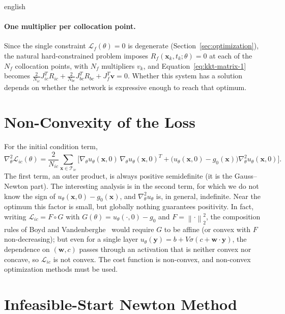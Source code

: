 \documentclass[11pt,letterpaper,twoside,openright]{book} %
\newcommand{\norm}[1]{\left\lVert #1 \right\rVert}
\newcommand{\Loss}{\mathcal{L}}
\newcommand{\T}{\mathcal{T}}
\begin{document}
\begin{hyphenrules}{english}
\paragraph{One multiplier per collocation point.}
Since the single constraint $\Loss_f(\theta)=0$ is degenerate (Section~\ref{sec:optimization}), the natural
hard-constrained problem imposes $R_f(\mathbf{x}_k,t_k;\theta)=0$ at each of the $N_f$ collocation points,
with $N_f$ multipliers $v_k$, and Equation~\eqref{eq:kkt-matrix-1} becomes
$\frac{2}{N_{ic}}J_{ic}^{T}R_{ic}+\frac{2}{N_{bc}}J_{bc}^{T}R_{bc}+J_f^{T}\mathbf{v}=0$. Whether this
system has a solution depends on whether the network is expressive enough to reach that optimum.

\section{Non-Convexity of the Loss}\label{app-sec:nonconvexity}

For the initial condition term,
\begin{equation}
  \nabla^2_\theta\Loss_{ic}(\theta)=\frac{2}{N_{ic}}\sum_{\mathbf{x}\in\T_{ic}}
  \Big[\nabla_\theta u_\theta(\mathbf{x},0)\,\nabla_\theta u_\theta(\mathbf{x},0)^{T}
  +\big(u_\theta(\mathbf{x},0)-g_0(\mathbf{x})\big)\nabla^2_\theta u_\theta(\mathbf{x},0)\Big].
  \label{eq:hessian-ic}
\end{equation}
The first term, an outer product, is always positive semidefinite (it is the Gauss--Newton part). The
interesting analysis is in the second term, for which we do not know the sign of
$u_\theta(\mathbf{x},0)-g_0(\mathbf{x})$, and $\nabla^2_\theta u_\theta$ is, in general, indefinite. Near the optimum this
factor is small, but globally nothing guarantees positivity. In fact, writing $\Loss_{ic}=F\circ G$ with
$G(\theta)=u_\theta(\cdot,0)-g_0$ and $F=\norm{\cdot}_2^2$, the composition rules of
Boyd and Vandenberghe~\cite{boyd2004} would require $G$ to be affine (or convex with $F$ non-decreasing); but even for a
single layer $u_\theta(\mathbf{y})=b+V\sigma(c+\mathbf{w}\cdot\mathbf{y})$, the dependence on $(\mathbf{w},c)$ passes
through an activation that is neither convex nor concave, so $\Loss_{ic}$ is not convex. The cost function
is non-convex, and non-convex optimization methods must be used.

\section{Infeasible-Start Newton Method}\label{app-sec:newton}


\end{hyphenrules}
\end{document}
